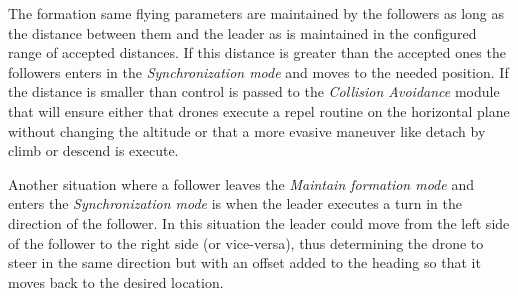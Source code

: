 The formation same flying parameters are maintained by the followers as long
as the distance between them and the leader as is maintained in the configured
range of accepted distances. If this distance is greater than the accepted ones
the followers enters in the \textit{Synchronization mode} and moves to the 
needed position. If the distance is smaller than control is passed to the
\textit{Collision Avoidance} module that will ensure either that drones
execute a repel routine on the horizontal plane without changing the altitude
or that a more evasive maneuver like detach by climb or descend is execute.

Another situation where a follower leaves the \textit{Maintain formation mode} 
and enters the \textit{Synchronization mode} is when the leader executes
a turn in the direction of the follower. In this situation the leader could 
move from the left side of the follower to the right side (or vice-versa), thus
determining the drone to steer in the same direction but with an offset added
to the heading so that it moves back to the desired location.


